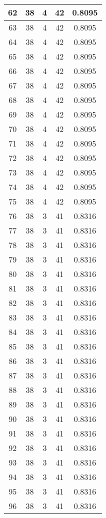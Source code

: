 \documentclass[letterpaper, 12pt]{article}
\begin{document}
\begin{longtable}{|c|c|c|c|c|}
\hline
62 & 38 & 4 & 42 & 0.8095 \\
\hline
63 & 38 & 4 & 42 & 0.8095 \\
\hline
64 & 38 & 4 & 42 & 0.8095 \\
\hline
65 & 38 & 4 & 42 & 0.8095 \\
\hline
66 & 38 & 4 & 42 & 0.8095 \\
\hline
67 & 38 & 4 & 42 & 0.8095 \\
\hline
68 & 38 & 4 & 42 & 0.8095 \\
\hline
69 & 38 & 4 & 42 & 0.8095 \\
\hline
70 & 38 & 4 & 42 & 0.8095 \\
\hline
71 & 38 & 4 & 42 & 0.8095 \\
\hline
72 & 38 & 4 & 42 & 0.8095 \\
\hline
73 & 38 & 4 & 42 & 0.8095 \\
\hline
74 & 38 & 4 & 42 & 0.8095 \\
\hline
75 & 38 & 4 & 42 & 0.8095 \\
\hline
76 & 38 & 3 & 41 & 0.8316 \\
\hline
77 & 38 & 3 & 41 & 0.8316 \\
\hline
78 & 38 & 3 & 41 & 0.8316 \\
\hline
79 & 38 & 3 & 41 & 0.8316 \\
\hline
80 & 38 & 3 & 41 & 0.8316 \\
\hline
81 & 38 & 3 & 41 & 0.8316 \\
\hline
82 & 38 & 3 & 41 & 0.8316 \\
\hline
83 & 38 & 3 & 41 & 0.8316 \\
\hline
84 & 38 & 3 & 41 & 0.8316 \\
\hline
85 & 38 & 3 & 41 & 0.8316 \\
\hline
86 & 38 & 3 & 41 & 0.8316 \\
\hline
87 & 38 & 3 & 41 & 0.8316 \\
\hline
88 & 38 & 3 & 41 & 0.8316 \\
\hline
89 & 38 & 3 & 41 & 0.8316 \\
\hline
90 & 38 & 3 & 41 & 0.8316 \\
\hline
91 & 38 & 3 & 41 & 0.8316 \\
\hline
92 & 38 & 3 & 41 & 0.8316 \\
\hline
93 & 38 & 3 & 41 & 0.8316 \\
\hline
94 & 38 & 3 & 41 & 0.8316 \\
\hline
95 & 38 & 3 & 41 & 0.8316 \\
\hline
96 & 38 & 3 & 41 & 0.8316 \\

\end{longtable}
\end{document}
